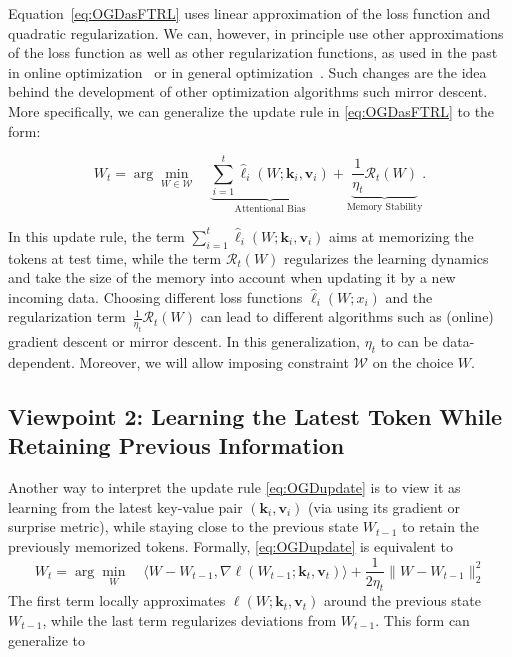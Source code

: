 \documentclass{article}
\newcommand{\citep}{\parencite}
\newcommand{\vk}[0]{\mathbf{k}}
\newcommand{\vvv}[0]{\mathbf{v}}
\newcommand{\cW}[0]{\mathcal{W}}
\newcommand{\undermath}[2]{\underset{#1}{\underbrace{#2}}}
\theoremstyle{plain}
\theoremstyle{definition}
\theoremstyle{remark}
\begin{document}
Equation~\eqref{eq:OGDasFTRL} uses linear approximation of the loss function and quadratic regularization. We can, however, in principle use other approximations of the loss function as well as other regularization functions, as used in the past in online optimization~\citep{shalev2012online,hazan2016introduction} or in general optimization~\citep{mairal2015incremental,razaviyayn2013unified}. Such changes are the idea behind the development of other optimization algorithms such  mirror descent. More specifically, we can generalize the update rule in \eqref{eq:OGDasFTRL} to the form:

\begin{equation}
\label{eq:Viewpoint1-OnlineRegression}
\tag{FTRL Viewpoint}
W_{t} = \arg\min_{W\in \cW}\quad \undermath{\text{Attentional Bias}}{\sum_{i=1}^t \widehat{\ell}_i(W;\vk_i, \vvv_i)}  + \undermath{\text{Memory Stability}}{\frac{1}{\eta_t} \mathcal{R}_t(W)}.
\end{equation}

In this update rule, the  term $\sum_{i=1}^t \widehat{\ell}_i(W;\vk_i, \vvv_i)$ aims at memorizing the tokens at test time, while the term $\mathcal{R}_t(W)$ regularizes the learning dynamics and take the size of the memory into account when updating it by a new incoming data. 
Choosing different loss functions $\widehat{\ell}_i(W;x_i)$ and the regularization term~$\frac{1}{\eta_t} \mathcal{R}_t(W)$ can lead to different algorithms such as (online) gradient descent or  mirror descent. In this generalization,  $\eta_t$ to can be data-dependent. Moreover, we will allow imposing constraint $\cW$ on the choice $W$.

\subsection{Viewpoint 2: Learning the Latest Token While Retaining Previous Information}
Another way to interpret the update rule \eqref{eq:OGDupdate} is to view it as learning from the latest key-value pair $(\vk_i, \vvv_i)$ (via using its gradient or surprise metric), while staying close to the previous state $W_{t-1}$ to retain the previously memorized tokens. Formally, \eqref{eq:OGDupdate} is equivalent to
\[
W_{t} = \arg\min_{W}\quad  \langle W-W_{t-1} , \nabla \ell(W_{t-1};\vk_t, \vvv_t) \rangle  + \frac{1}{2\eta_t} \|W - W_{t-1}\|_2^2
\]
The first term locally approximates $\ell(W;\vk_t, \vvv_t)$ around the previous state $W_{t-1}$, while the last term regularizes  deviations from $W_{t-1}$. This form can generalize to 
\end{document}

